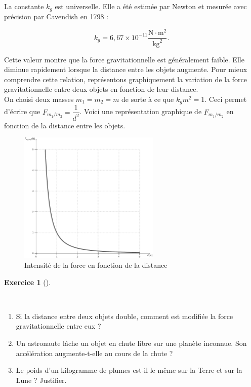 \documentclass[
  letterpaper,
  DIV=11,
  numbers=noendperiod]{scrartcl}
\providecommand{\tightlist}{%
  \setlength{\itemsep}{0pt}\setlength{\parskip}{0pt}}\usepackage{longtable,booktabs,array}
\theoremstyle{definition}
\theoremstyle{definition}
\theoremstyle{definition}
\newtheorem{exercise}{Exercice}[section]
\theoremstyle{remark}
\begin{document}
La constante \(k_g\) est universelle. Elle a été estimée par Newton et
mesurée avec précision par Cavendish en 1798 :

\[
k_g = 6,67 \times 10^{-11} \dfrac{\text{N} \cdot \text{m}^2}{\text{kg}^2}.
\]

Cette valeur montre que la force gravitationnelle est généralement
faible. Elle diminue rapidement lorsque la distance entre les objets
augmente. Pour mieux comprendre cette relation, représentons
graphiquement la variation de la force gravitationnelle entre deux
objets en fonction de leur distance.\\
On choisi deux masses \(m_1=m_2=m\) de sorte à ce que \(k_gm^2=1\). Ceci
permet d'écrire que \(F_{m_1/m_2}=\dfrac{1}{d^2}\). Voici une
représentation graphique de \(F_{m_1/m_2}\) en fonction de la distance
entre les objets.

\begin{figure}[H]

{\centering \includegraphics[width=0.6\textwidth,height=\textheight]{figures/grav/fig02.pdf}

}

\caption{Intensité de la force en fonction de la distance}

\end{figure}%

\begin{exercise}[]\protect\hypertarget{exr-refl}{}\label{exr-refl}

~

\begin{enumerate}
\def\labelenumi{\arabic{enumi}.}
\tightlist
\item
  Si la distance entre deux objets double, comment est modifiée la force
  gravitationnelle entre eux ?
\item
  Un astronaute lâche un objet en chute libre sur une planète inconnue.
  Son accélération augmente-t-elle au cours de la chute ?
\item
  Le poids d'un kilogramme de plumes est-il le même sur la Terre et sur
  la Lune ? Justifier.
\end{enumerate}

\end{exercise}
\end{document}
